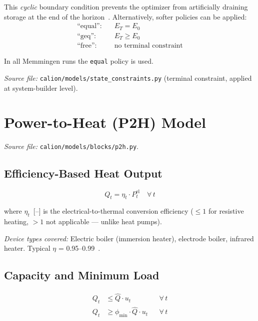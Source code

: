 \documentclass[a4paper,12pt]{article}
\begin{document}
This \emph{cyclic} boundary condition prevents the optimizer from artificially draining
storage at the end of the horizon~\cite{Lund2007}.
Alternatively, softer policies can be applied:
\begin{align*}
  \text{``equal'':} & \quad E_{T} = E_{0} \\
  \text{``geq'':}   & \quad E_{T} \geq E_{0} \\
  \text{``free'':}  & \quad \text{no terminal constraint}
\end{align*}

In all Memmingen runs the \texttt{equal} policy is used.

\noindent\textit{Source file:} \texttt{calion/models/state\_constraints.py}
(terminal constraint, applied at system-builder level).

\section{Power-to-Heat (P2H) Model}
\label{sec:p2h}

\textit{Source file:} \texttt{calion/models/blocks/p2h.py}.

\subsection{Efficiency-Based Heat Output}

\begin{equation}
  Q_{t} = \eta_{t} \cdot P^{\text{el}}_{t}
  \quad \forall\, t
  \tag{P2H-1}
  \label{eq:p2h1}
\end{equation}

where $\eta_{t}$~[--] is the electrical-to-thermal conversion efficiency ($\leq 1$ for
resistive heating, $> 1$ not applicable --- unlike heat pumps).

\noindent\textit{Device types covered:} Electric boiler (immersion heater), electrode boiler,
infrared heater. Typical $\eta$ = 0.95–0.99~\cite{Lund2015}.

\subsection{Capacity and Minimum Load}

\begin{align}
  Q_{t} &\leq \hat{Q} \cdot u_{t}              && \forall\, t \tag{P2H-2} \label{eq:p2h2} \\
  Q_{t} &\geq \phi_{\min} \cdot \hat{Q} \cdot u_{t} && \forall\, t \tag{P2H-3} \label{eq:p2h3}
\end{align}
\end{document}
